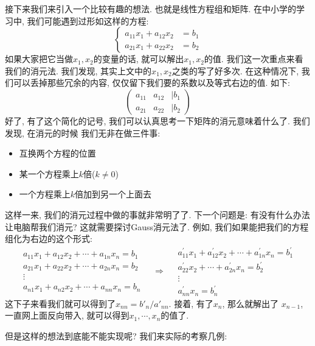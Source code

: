  接下来我们来引入一个比较有趣的想法. 也就是线性方程组和矩阵. 
在中小学的学习中, 我们可能遇到过形如这样的方程: 
$$\begin{cases}
a_{11}x_{1}+a_{12}x_{2} & =b_{1}\\
a_{21}x_{1}+a_{22}x_{2} & =b_{2}
\end{cases}$$
如果大家把它当做$x_1, x_2$的变量的话, 就可以解出$x_1, x_2$的值. 我们这一次重点来看
我们的消元法. 我们发现, 其实上文中的$x_1, x_2$之类的写了好多次. 在这种情况下, 
我们可以丢掉那些冗余的内容, 仅仅留下我们要的系数以及等式右边的值. 如下: 
$$
\begin{pmatrix}
    a_{11} & a_{12} &\mid b_1\\
    a_{21} & a_{22} &\mid b_2
\end{pmatrix}
$$
好了, 有了这个简化的记号, 我们可以认真思考一下矩阵的消元意味着什么了. 我们发现, 在消元的时候
我们无非在做三件事: 
\begin{itemize}[noitemsep]
    \item 互换两个方程的位置
    \item 某一个方程乘上$k$倍($k\neq 0$)
    \item 一个方程乘上$k$倍加到另一个上面去
\end{itemize}
这样一来, 我们的消元过程中做的事就非常明了了. 下一个问题是: 有没有什么办法让电脑帮我们消元?
这就需要探讨Gauss消元法了. 例如, 我们如果能把我们的方程组化为右边的这个形式: 
$$
\begin{array}{c}
    a_{11} x_{1}+a_{12} x_{2}+\cdots+a_{1 n} x_{n}=b_{1} \\
    a_{21} x_{1}+a_{22} x_{2}+\cdots+a_{2 n} x_{n}=b_{2} \\
    \vdots \\
    a_{n 1} x_{1}+a_{n 2} x_{2}+\cdots+a_{n n} x_{n}=b_{n}
    \end{array} \quad \Rightarrow \quad \begin{array}{r}
    a_{11}^{\prime} x_{1}+a_{12}^{\prime} x_{2}+\cdots+a_{1 n}^{\prime} x_{n}=b_{1}^{\prime} \\
    a_{22}^{\prime} x_{2}+\cdots+a_{2 n}^{\prime} x_{n}=b_{2}^{\prime} \\
    \vdots \\
    a_{n n}^{\prime} x_{n}=b_{n}^{\prime}
    \end{array}
$$
这下子来看我们就可以得到了$x_{nn}={b'_n}/{a'_{nn}}$. 接着, 有了$x_n$, 那么就解出了
$x_{n-1}$, 一直网上面反向带入, 就可以得到$x_1,\cdots, x_n$的值了. 

但是这样的想法到底能不能实现呢? 我们来实际的考察几例: 

